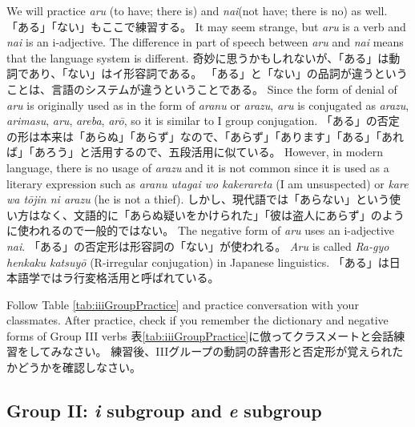 \documentclass[uplatex,dvipdfmx,b5paper,english,10pt]{jsbook}
\begin{document}
\ifEnglish
We will practice {\it aru\/} (to have; there is) and {\it nai\/}(not have; there is no) as well.
\else
「ある」「ない」もここで練習する。
\fi
\ifEnglish
It may seem strange, but {\it aru\/} is a verb and {\it nai\/} is an i-adjective.
The difference in part of speech between {\it aru\/} and {\it nai\/} means that the language system is different.
\else
奇妙に思うかもしれないが、「ある」は動詞であり、「ない」はイ形容詞である。
「ある」と「ない」の品詞が違うということは、言語のシステムが違うということである。
\fi
\ifEnglish
Since the form of denial of {\it aru\/} is originally used as in the form of {\it aranu\/} or {\it arazu\/}, {\it aru\/} is conjugated as {\it arazu\/}, {\it arimasu\/}, {\it aru\/}, {\it areba\/}, {\it ar\=o\/}, so it is similar to I group conjugation.
\else
「ある」の否定の形は本来は「あらぬ」「あらず」なので、「あらず」「あります」「ある」「あれば」「あろう」と活用するので、五段活用に似ている。
\fi
\ifEnglish
However, in modern language, there is no usage of {\it arazu\/} and it is not common since it is used as a literary expression such as {\it aranu utagai wo kakerareta\/} (I am unsuspected) or {\it kare wa t\=ojin ni arazu\/} (he is not a thief).
\else
しかし、現代語では「あらない」という使い方はなく、文語的に「あらぬ疑いをかけられた」「彼は盗人にあらず」のように使われるので一般的ではない。
\fi
\ifEnglish
The negative form of {\it aru\/} uses an i-adjective {\it nai\/}.
\else
「ある」の否定形は形容詞の「ない」が使われる。
\fi
\ifEnglish
{\it Aru\/} is called {\it Ra-gyo henkaku katsuy\=o\/} (R-irregular conjugation) in Japanese linguistics.
\else
「ある」は日本語学ではラ行変格活用と呼ばれている。
\fi

\begin{toiquestion}
\ifEnglish
Follow Table \ref{tab:iiiGroupPractice} and practice conversation with your classmates.
After practice, check if you remember the dictionary and negative forms of Group III verbs
\else
表\ref{tab:iiiGroupPractice}に倣ってクラスメートと会話練習をしてみなさい。
練習後、IIIグループの動詞の辞書形と否定形が覚えられたかどうかを確認しなさい。
\fi
\end{toiquestion}


\subsection*{Group II: {\it i\/} subgroup and {\it e\/} subgroup}
\end{document}
